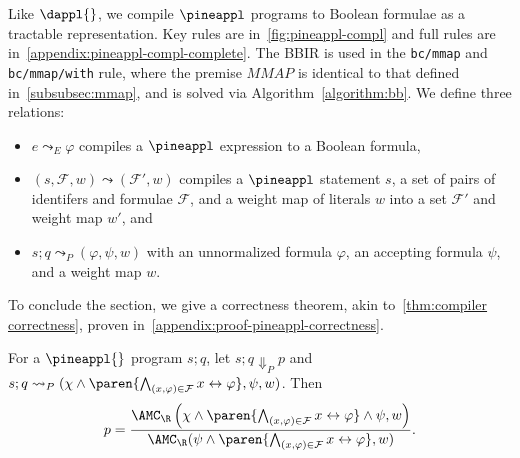 Like $\dappl{}$, we compile $\pineappl$ programs to Boolean formulae as a tractable
representation. Key rules are in~\cref{fig:pineappl-compl} and full rules are in~\cref{appendix:pineappl-compl-complete}.
The BBIR is used in the \texttt{bc/mmap} and \texttt{bc/mmap/with} rule, where
the premise $MMAP$ is identical to that defined in~\cref{subsubsec:mmap}, and is solved via
Algorithm~\ref{algorithm:bb}. We define three relations:
\begin{itemize}[leftmargin=*]
  \item $e \leadsto_E \varphi$ compiles a $\pineappl$ expression to a Boolean formula,
  \item $(s, \mathcal{F}, w) \leadsto (\mathcal{F}', w)$ compiles a $\pineappl$ statement $s$,
  a set of pairs of identifers and formulae $\mathcal F$, and a weight map of literals $w$
  into a set $\mathcal{F'}$ and weight map $w'$, and
  \item $s ; q \leadsto_P (\varphi, \psi, w)$ with an unnormalized formula $\varphi$, an accepting formula $\psi$, and a weight map $w$.
\end{itemize}

To conclude the section, we give a correctness theorem, akin to~\cref{thm:compiler correctness}, proven in~\cref{appendix:proof-pineappl-correctness}.

\begin{theorem}\label{thm:pineappl correctness}
  For a $\pineappl{}$ program $s;q$, let $s ; q\Downarrow_P p$ and
  $s ; q \leadsto_P (\chi \land \paren{\bigwedge_{(x, \varphi) \in \mathcal{F}} x \leftrightarrow \varphi},\psi, w)$.
  Then
  {\footnotesize\begin{equation}
    p = \frac{\AMC_{\R}\left(\chi \land \paren{\bigwedge_{(x, \varphi) \in \mathcal{F}} x \leftrightarrow \varphi} \land \psi,w\right)}{\AMC_{\R}(\psi \land \paren{\bigwedge_{(x, \varphi) \in \mathcal{F}} x \leftrightarrow \varphi}, w)}.
  \end{equation}}
\end{theorem}

